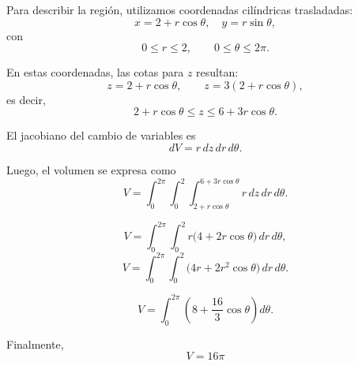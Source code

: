 Para describir la región, utilizamos coordenadas cilíndricas trasladadas:
\[
x = 2 + r\cos\theta, \quad y = r\sin\theta,
\]
con
\[
0 \leq r \leq 2, \qquad 0 \leq \theta \leq 2\pi.
\]

En estas coordenadas, las cotas para \(z\) resultan:
\[
z = 2 + r\cos\theta, \qquad z = 3(2 + r\cos\theta),
\]
es decir,
\[
2 + r\cos\theta \leq z \leq 6 + 3r\cos\theta.
\]

El jacobiano del cambio de variables es
\[
dV = r \, dz \, dr \, d\theta.
\]

Luego, el volumen se expresa como
\[
V = \int_0^{2\pi} \int_0^2 \int_{2 + r\cos\theta}^{6 + 3r\cos\theta} r \, dz \, dr \, d\theta.
\]


\[
V = \int_0^{2\pi} \int_0^2 r \big(4 + 2r\cos\theta\big) \, dr \, d\theta,
\]
\[
V = \int_0^{2\pi} \int_0^2 \big(4r + 2r^2\cos\theta\big) \, dr \, d\theta.
\]

\[
V = \int_0^{2\pi} \left(8 + \frac{16}{3}\cos\theta\right) d\theta.
\]

Finalmente,
\[
\boxed{V = 16\pi}
\]
